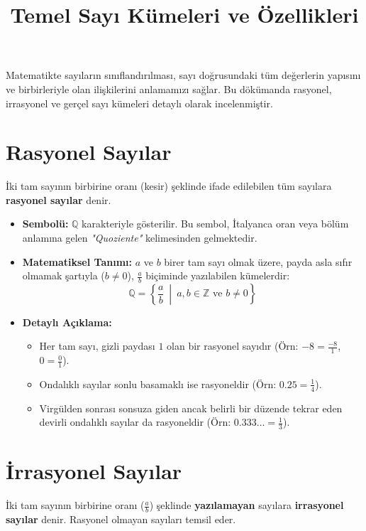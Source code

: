 \documentclass{article}
\title{Temel Sayı Kümeleri ve Özellikleri}
\author{}
\date{}
\begin{document}
\maketitle

Matematikte sayıların sınıflandırılması, sayı doğrusundaki tüm değerlerin yapısını ve birbirleriyle olan ilişkilerini anlamamızı sağlar. Bu dökümanda rasyonel, irrasyonel ve gerçel sayı kümeleri detaylı olarak incelenmiştir.

\section{Rasyonel Sayılar}
İki tam sayının birbirine oranı (kesir) şeklinde ifade edilebilen tüm sayılara \textbf{rasyonel sayılar} denir.

\begin{itemize}
    \item \textbf{Sembolü:} $\mathbb{Q}$ karakteriyle gösterilir. Bu sembol, İtalyanca oran veya bölüm anlamına gelen \textit{"Quoziente"} kelimesinden gelmektedir.
    \item \textbf{Matematiksel Tanımı:} $a$ ve $b$ birer tam sayı olmak üzere, payda asla sıfır olmamak şartıyla ($b \neq 0$), $\frac{a}{b}$ biçiminde yazılabilen kümelerdir:
    \begin{equation*}
        \mathbb{Q} = \left\{ \frac{a}{b} \ \middle|\ a, b \in \mathbb{Z} \text{ ve } b \neq 0 \right\}
    \end{equation*}
    \item \textbf{Detaylı Açıklama:} 
    \begin{itemize}
        \item Her tam sayı, gizli paydası $1$ olan bir rasyonel sayıdır (Örn: $-8 = \frac{-8}{1}$, $0 = \frac{0}{1}$).
        \item Ondalıklı sayılar sonlu basamaklı ise rasyoneldir (Örn: $0.25 = \frac{1}{4}$).
        \item Virgülden sonrası sonsuza giden ancak belirli bir düzende tekrar eden devirli ondalıklı sayılar da rasyoneldir (Örn: $0.333\dots = \frac{1}{3}$).
    \end{itemize}
\end{itemize}

\section{İrrasyonel Sayılar}
İki tam sayının birbirine oranı ($\frac{a}{b}$) şeklinde \textbf{yazılamayan} sayılara \textbf{irrasyonel sayılar} denir. Rasyonel olmayan sayıları temsil eder.
\end{document}

